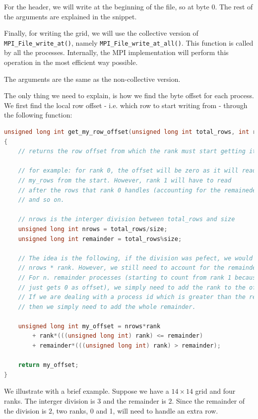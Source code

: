\documentclass{report}
\begin{document}
For the header, we will write at the beginning of the file, so at byte 0. The 
rest of the arguments are explained in the snippet.

Finally, for writing the grid, we will use the collective version of 
\texttt{MPI\_File\_write\_at()}, namely \texttt{MPI\_File\_write\_at\_all()}. 
This function is called by all the processes. Internally, the MPI 
implementation will perform this operation in the most efficient way possible.

The arguments are the same as the non-collective version. 

The only thing we need to explain, is how we find the byte offset for each 
process. We first find the local row offset - i.e. which row to start writing from - 
through the following function:

\begin{lstlisting}[language=C++]
unsigned long int get_my_row_offset(unsigned long int total_rows, int rank, int size)
{
    // returns the row offset from which the rank must start getting its rows 

    // for example: for rank 0, the offset will be zero as it will read 
    // my_rows from the start. However, rank 1 will have to read 
    // after the rows that rank 0 handles (accounting for the remaineder), 
    // and so on.

    // nrows is the interger division between total_rows and size
    unsigned long int nrows = total_rows/size;
    unsigned long int remainder = total_rows%size;

    // The idea is the following, if the division was pefect, we would do 
    // nrows * rank. However, we still need to account for the remainder.
    // For n. remainder processes (starting to count from rank 1 because rank 0 
    // just gets 0 as offset), we simply need to add the rank to the offset. 
    // If we are dealing with a process id which is greater than the remainder, 
    // then we simply need to add the whole remainder.
    
    unsigned long int my_offset = nrows*rank
        + rank*(((unsigned long int) rank) <= remainder) 
        + remainder*(((unsigned long int) rank) > remainder);

    return my_offset;
}
\end{lstlisting}

We illustrate with a brief example. Suppose we have a $14\times 14$ grid and four 
ranks. The interger division is $3$ and the remainder is $2$. Since the 
remainder of the division is $2$, two ranks, 0 and 1, will need to handle an 
extra row. 
\end{document}
